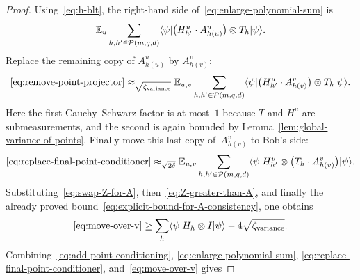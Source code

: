 \begin{proof}
  Using~\eqref{eq:h-blt}, the right-hand side of~\eqref{eq:enlarge-polynomial-sum} is
  \begin{equation}\label{eq:remove-point-projector}
    \mathbb{E}_{u} \sum_{h, h' \in \mathcal{P}(m,q,d)} \langle \psi \rvert \bigl(H^{u}_{h'} \cdot A^{u}_{h(u)}\bigr) \otimes T_h \lvert \psi \rangle.
  \end{equation}
  Replace the remaining copy of $A^u_{h(u)}$ by $A^v_{h(v)}$:
  \begin{equation}\label{eq:replace-final-point-conditioner}
    \eqref{eq:remove-point-projector}
    \approx_{\sqrt{\zeta_{\mathrm{variance}}}}
    \mathbb{E}_{u,v} \sum_{h, h' \in \mathcal{P}(m,q,d)} \langle \psi \rvert \bigl(H^{u}_{h'} \cdot A^{v}_{h(v)}\bigr) \otimes T_h \lvert \psi \rangle.
  \end{equation}
  Here the first Cauchy--Schwarz factor is at most~$1$ because $T$ and $H^u$ are submeasurements, and the second is again bounded by Lemma~\ref{lem:global-variance-of-points}. Finally move this last copy of~$A^v_{h(v)}$ to Bob's side:
  \begin{equation}\label{eq:move-over-v}
    \eqref{eq:replace-final-point-conditioner}
    \approx_{\sqrt{2\delta}}
    \mathbb{E}_{u,v} \sum_{h, h' \in \mathcal{P}(m,q,d)} \langle \psi \rvert H^{u}_{h'}  \otimes \bigl(T_h \cdot A^{v}_{h(v)}\bigr) \lvert \psi \rangle.
  \end{equation}
  Substituting~\eqref{eq:swap-Z-for-A}, then~\eqref{eq:Z-greater-than-A}, and finally the already proved bound~\eqref{eq:explicit-bound-for-A-consistency}, one obtains
  \[
    \eqref{eq:move-over-v}
    \ge \sum_h \langle \psi \rvert H_h \otimes I \lvert \psi \rangle - 4\sqrt{\zeta_{\mathrm{variance}}}.
  \]
  Combining~\eqref{eq:add-point-conditioning}, \eqref{eq:enlarge-polynomial-sum}, \eqref{eq:replace-final-point-conditioner}, and~\eqref{eq:move-over-v} gives

\end{proof}
